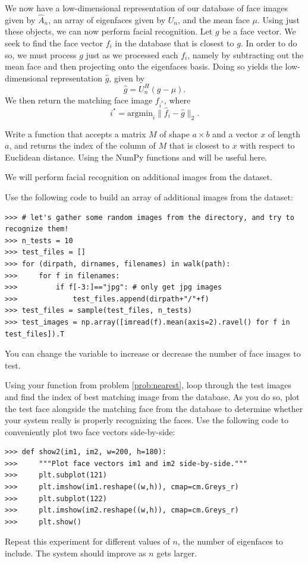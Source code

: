 We now have a low-dimensional representation of our database of face images given by $\hat{A}_n$, an array of eigenfaces given by $U_n$,
and the mean face $\mu$. Using just these objects, we can now perform facial recognition.
Let $g$ be a face vector.
We seek to find the face vector $f_i$ in the database that is closest to $g$.
In order to do so, we must process $g$ just as we processed each $f_i$, namely by subtracting out the mean face and then projecting onto the
eigenfaces basis.
Doing so yields the low-dimensional representation $\hat{g}$, given by
\[
\hat{g} = U_n^H(g-\mu).
\]
We then return the matching face image $f_{i^*}$, where
\[
i^* = \text{argmin}_i \|\hat{f}_i - \hat{g}\|_2.
\]
\begin{problem}
\label{prob:nearest}
Write a function  that accepts a matrix $M$ of shape $a \times b$ and a vector $x$
of length $a$, and returns the index of the column of $M$ that is closest to $x$ with respect to Euclidean distance.
Using the NumPy functions  and  will be useful here.
\end{problem}

\begin{problem}
\label{prob:match}
We will perform facial recognition on additional images from the  dataset.


Use the following code to build an array of additional images from the dataset:
\begin{lstlisting}
>>> # let's gather some random images from the directory, and try to recognize them!
>>> n_tests = 10
>>> test_files = []
>>> for (dirpath, dirnames, filenames) in walk(path):
>>>     for f in filenames:
>>>         if f[-3:]=="jpg": # only get jpg images
>>>             test_files.append(dirpath+"/"+f)
>>> test_files = sample(test_files, n_tests)
>>> test_images = np.array([imread(f).mean(axis=2).ravel() for f in test_files]).T
\end{lstlisting}
You can change the variable  to increase or decrease the number of face images to test.

Using your function  from problem \ref{prob:nearest}, loop through the test images and find
the index of best matching image from the database.
As you do so, plot the test face alongside the matching face from the database to determine whether your system
really is properly recognizing the faces.
Use the following code to conveniently plot two face vectors side-by-side:
\begin{lstlisting}
>>> def show2(im1, im2, w=200, h=180):
>>>     """Plot face vectors im1 and im2 side-by-side."""
>>>     plt.subplot(121)
>>>     plt.imshow(im1.reshape((w,h)), cmap=cm.Greys_r)
>>>     plt.subplot(122)
>>>     plt.imshow(im2.reshape((w,h)), cmap=cm.Greys_r)
>>>     plt.show()
\end{lstlisting}

Repeat this experiment for different values of $n$, the number of eigenfaces to include.
The system should improve as $n$ gets larger.
\end{problem}

